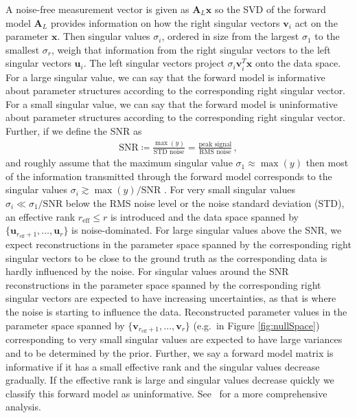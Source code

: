 A noise-free measurement vector is given as $\bm{A}_L\bm{x}$ so the SVD of the forward model $\bm{A}_L$ provides information on how the right singular vectors $\bm{v}_i$ act on the parameter $\bm{x}$.
Then singular values $\sigma_i $, ordered in size from the largest $\sigma_1$ to the smallest $\sigma_{r}$, weigh that information from the right singular vectors to the left singular vectors $\bm{u}_i$.
The left singular vectors project $\sigma_i \bm{v}^T_i \bm{x} $ onto the data space.
For a large singular value, we can say that the forward model is informative about parameter structures according to the corresponding right singular vector. 
For a small singular value, we can say that the forward model is uninformative about parameter structures according to the corresponding right singular vector.
Further, if we define the SNR as
\begin{align}
	\text{SNR} \coloneqq \frac{\max(y)}{\text{STD noise}} = \frac{\text{peak signal}}{\text{RMS noise}} \label{eq:SNR} \, ,
\end{align}
and roughly assume that the maximum singular value $\sigma_1  \approx \max(y)$ then most of the information transmitted through the forward model corresponds to the singular values $\sigma_i \gtrsim \max(y)/ \text{SNR}$ \cite{fox2025BlokkLecNot}.
For very small singular values $\sigma_i \ll \sigma_1/\text{SNR}$ below the RMS noise level or the noise standard deviation (STD), an effective rank $r_{\text{eff}} \leq r$ is introduced and the data space spanned by $ \{\bm{u}_{r_{\text{eff}} +1}, \dots ,\bm{u}_r \}$ is noise-dominated.
For large singular values above the SNR, we expect reconstructions in the parameter space spanned by the corresponding right singular vectors to be close to the ground truth as the corresponding data is hardly influenced by the noise.
For singular values around the SNR reconstructions in the parameter space spanned by the corresponding right singular vectors are expected to have increasing uncertainties, as that is where the noise is starting to influence the data.
Reconstructed parameter values in the parameter space spanned by $ \{\bm{v}_{r_{\text{eff}} +1}, \dots ,\bm{v}_r \}$ (e.g.~in Figure \ref{fig:nullSpace}) corresponding to very small singular values are expected to have large variances and to be determined by the prior.
Further, we say a forward model matrix is informative if it has a small effective rank and the singular values decrease gradually.
If the effective rank is large and singular values decrease quickly we classify this forward model as uninformative.
See~\cite{tan2016LecNot} for a more comprehensive analysis.

